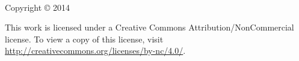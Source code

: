 \begin{center}
    \setlength{\parskip}{\baselineskip}
    \thetitle\\
    Copyright \copyright{} 2014 \theauthor

    {\Huge\ccbync}

    This work is licensed under a Creative Commons
    Attribution\-/NonCommercial license. To view a copy of this
    license, visit
    \url{http://creativecommons.org/licenses/by-nc/4.0/}.
\end{center}

